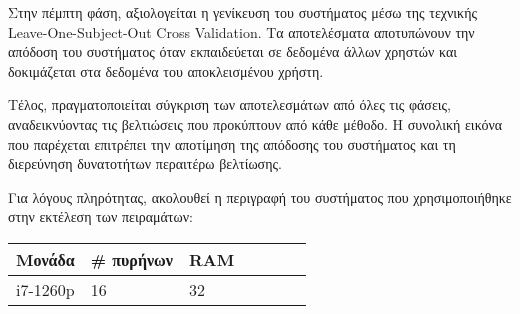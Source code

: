Στην πέμπτη φάση, αξιολογείται η γενίκευση του συστήματος μέσω της τεχνικής Leave-One-Subject-Out Cross Validation. Τα αποτελέσματα αποτυπώνουν την απόδοση του συστήματος όταν εκπαιδεύεται σε δεδομένα άλλων χρηστών και δοκιμάζεται στα δεδομένα του αποκλεισμένου χρήστη.

Τέλος, πραγματοποιείται σύγκριση των αποτελεσμάτων από όλες τις φάσεις, αναδεικνύοντας τις βελτιώσεις που προκύπτουν από κάθε μέθοδο. Η συνολική εικόνα που παρέχεται επιτρέπει την αποτίμηση της απόδοσης του συστήματος και τη διερεύνηση δυνατοτήτων περαιτέρω βελτίωσης.

Για λόγους πληρότητας, ακολουθεί η περιγραφή του συστήματος που χρησιμοποιήθηκε στην εκτέλεση των πειραμάτων:
\begin{center}
\small
\begin{tabular}{ | l | l | l | l | l | l | l | }
  \hline
  \rowcolor{Gray}
  Μονάδα & \# πυρήνων & RAM \\
  \hline
  i7-1260p & 16 & 32 \\
  \hline
\end{tabular}
\end{center}








